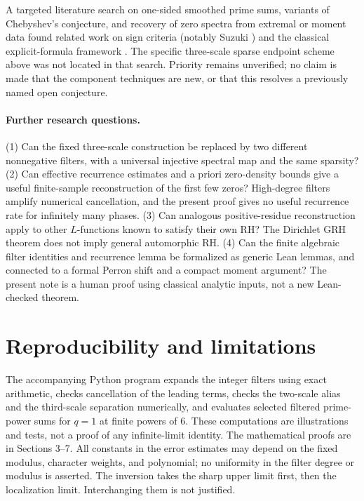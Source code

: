 \documentclass[11pt]{article}
\theoremstyle{remark}\newtheorem{remark}[theorem]{Remark}
\begin{document}
A targeted literature search on one-sided smoothed prime sums, variants of Chebyshev's conjecture, and recovery of zero spectra from extremal or moment data found related work on sign criteria (notably Suzuki \cite{suzuki}) and the classical explicit-formula framework \cite{davenport,mv,wiki}. The specific three-scale sparse endpoint scheme above was not located in that search. Priority remains unverified; no claim is made that the component techniques are new, or that this resolves a previously named open conjecture.

\paragraph{Further research questions.} (1) Can the fixed three-scale construction be replaced by two different nonnegative filters, with a universal injective spectral map and the same sparsity? (2) Can effective recurrence estimates and a priori zero-density bounds give a useful finite-sample reconstruction of the first few zeros? High-degree filters amplify numerical cancellation, and the present proof gives no useful recurrence rate for infinitely many phases. (3) Can analogous positive-residue reconstruction apply to other $L$-functions known to satisfy their own RH? The Dirichlet GRH theorem does not imply general automorphic RH. (4) Can the finite algebraic filter identities and recurrence lemma be formalized as generic Lean lemmas, and connected to a formal Perron shift and a compact moment argument? The present note is a human proof using classical analytic inputs, not a new Lean-checked theorem.

\section{Reproducibility and limitations}
The accompanying Python program expands the integer filters using exact arithmetic, checks cancellation of the leading terms, checks the two-scale alias and the third-scale separation numerically, and evaluates selected filtered prime-power sums for $q=1$ at finite powers of $6$. These computations are illustrations and tests, not a proof of any infinite-limit identity. The mathematical proofs are in Sections 3--7. All constants in the error estimates may depend on the fixed modulus, character weights, and polynomial; no uniformity in the filter degree or modulus is asserted. The inversion takes the sharp upper limit first, then the localization limit. Interchanging them is not justified.
\end{document}
